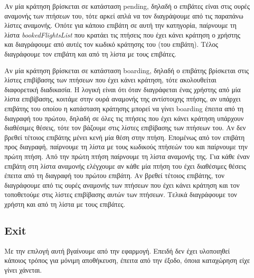 \documentclass[a4paper]{article}
\begin{document}
Αν μία κράτηση βρίσκεται σε κατάσταση pending, δηλαδή ο επιβάτες είναι στις
ουρές αναμονής των πτήσεων του, τότε αρκεί απλά να τον διαγράψουμε από τις
παραπάνω λίστες αναμονής. Οπότε για κάποιο επιβάτη σε αυτή την κατηγορία,
παίρνουμε τη λίστα \emph{bookedFlightsList} που κρατάει τις πτήσεις που έχει
κάνει κράτηση ο χρήστης και διαγράφουμε από αυτές τον κωδικό κράτησης του (του
επιβάτη). Τέλος διαγράφουμε τον επιβάτη και από τη λίστα με τους επιβάτες.

Αν μία κράτηση βρίσκεται σε κατάσταση boarding, δηλαδή ο επιβάτης βρίσκεται στις
λίστες επιβίβασης των πτήσεων που έχει κάνει κράτηση, τότε ακολουθείται
διαφορετική διαδικασία. Η λογική είναι ότι όταν διαγράφεται ένας χρήστης από μία
λίστα επιβίβασης, κοιτάμε στην ουρά αναμονής της αντίστοιχης πτήσης, αν υπάρχει
επιβάτης του οποίου η κατάσταση κράτησης μπορεί να γίνει boarding έπειτα από τη
διαγραφή του πρώτου, δηλαδή σε όλες τις πτήσεις που έχει κάνει κράτηση υπάρχουν
διαθέσιμες θέσεις, τότε τον βάζουμε στις λίστες επιβίβασης των πτήσεων του. Αν
δεν βρεθεί τέτοιος επιβάτης μένει κενή μία θέση στην πτήση. Επομένως από τον
επιβάτη προς διαγραφή, παίρνουμε τη λίστα με τους κωδικούς πτήσεών του και
παίρνουμε την πρώτη πτήση. Από την πρώτη πτήση παίρνουμε τη λίστα αναμονής της.
Για κάθε έναν επιβάτη στη λίστα αναμονής ελέγχουμε αν κάθε μία πτήση του έχει
διαθέσιμες θέσεις έπειτα από τη διαγραφή του πρώτου επιβάτη. Αν βρεθεί τέτοιος
επιβάτης, τον διαγράφουμε από τις ουρές αναμονής των πτήσεων που έχει κάνει
κράτηση και τον τοποθετούμε στις λίστες επιβίβασης αυτών των πτήσεων. Τελικά
διαγράφουμε τον χρήστη και από τη λίστα με τους επιβάτες.
\subsection{Exit}
Με την επιλογή αυτή βγαίνουμε από την εφαρμογή. Επειδή δεν έχει υλοποιηθεί
κάποιος τρόπος για μόνιμη αποθήκευση, έπειτα από την έξοδο, όποια καταχώρηση
είχε γίνει χάνεται.
\end{document}
